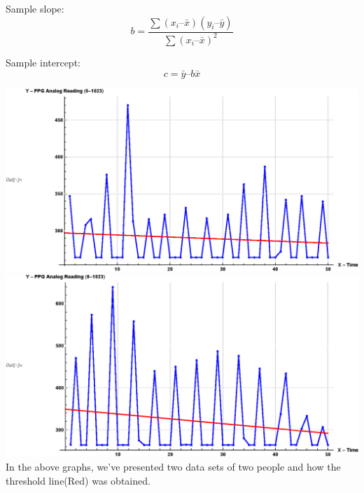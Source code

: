 \documentclass[12pt]{article}
\begin{document}
{Sample slope:
\begin{equation}
b = \frac{\sum(x_i – \bar{x}) (y_i – \bar{y})} {\sum(x_i – \bar{x})^2}
\end{equation}

Sample intercept:
\begin{equation}
c = \bar{y} – b \bar{x}
\end{equation}

	\includegraphics[scale=0.8]{simulation1_gr1.eps}\\
	\includegraphics[scale=0.81]{simulation1_gr2.eps}
\;
\;
\;
\;
\;
	In the above graphs, we've presented two data sets of two people and how the threshold line(Red) was obtained.



}
\end{document}
